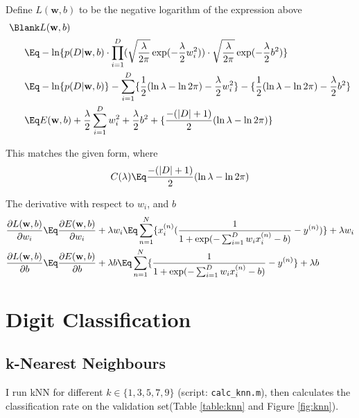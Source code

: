 \documentclass{article}
\begin{document}
Define $L(\mathbf{w},b)$ to be the negative logarithm of the expression above
\begin{align*}
\Blank & L(\mathbf{w},b)\\
\Eq & -\ln\{ p(D | \mathbf{w}, b) \cdot \prod_{i=1}^{D} ( \sqrt{\frac{\lambda}{2\pi}} \exp(-\frac{\lambda}{2}w_i^2) ) \cdot  \sqrt{\frac{\lambda}{2\pi}} \exp(-\frac{\lambda}{2}b^2) \}\\
\Eq & -\ln\{ p(D | \mathbf{w}, b) \} -\sum_{i=1}^{D} \{ \frac{1}{2} (\ln \lambda - \ln 2 \pi) - \frac{\lambda}{2}w_i^2 \} - \{ \frac{1}{2} (\ln \lambda - \ln 2 \pi) - \frac{\lambda}{2}b^2 \}\\
\Eq & E(\mathbf{w},b) + \frac{\lambda}{2} \sum_{i=1}^{D} w_i^2 + \frac{\lambda}{2}b^2 + \{ \frac{-(|D| + 1)}{2}(\ln \lambda - \ln 2 \pi) \}
\end{align*}

This matches the given form, where
\begin{align*}
C(\lambda) \Eq \frac{-(|D| + 1)}{2}(\ln \lambda - \ln 2 \pi)
\end{align*}

The derivative with respect to $w_i$, and $b$
\begin{align*}
\iffalse
\frac{\partial L(\mathbf{w},b)}{\partial \lambda} & \Eq \frac{1}{2} \sum_{i=1}^{D} w_i^2 + \frac{b^2}{2} - \frac{|D| + 1}{2 \lambda}\\
\fi
\frac{\partial L(\mathbf{w},b)}{\partial w_i} & \Eq \frac{\partial E(\mathbf{w}, b)}{\partial w_i} + \lambda w_i \Eq \sum_{n=1}^{N} \{ x_{i}^{(n)} (\frac{1}{1 + \exp(- \sum_{i=1}^{D} w_{i}x_{i}^{(n)} - b)} - y^{(n)}) \} + \lambda w_i\\
\frac{\partial L(\mathbf{w},b)}{\partial b} & \Eq \frac{\partial E(\mathbf{w}, b)}{\partial b} + \lambda b \Eq \sum_{n=1}^{N} \{\frac{1}{1 + \exp(- \sum_{i=1}^{D} w_{i}x_{i}^{(n)} - b)} - y^{(n)} \} + \lambda b\\
\end{align*}

\section{Digit Classification}

\subsection{k-Nearest Neighbours}

I run kNN for different $k \in \{1,3,5,7,9\}$ (script: \texttt{calc\_knn.m}), then calculates the classification rate on the validation set(Table \ref{table:knn} and Figure \ref{fig:knn}).\\
\end{document}
